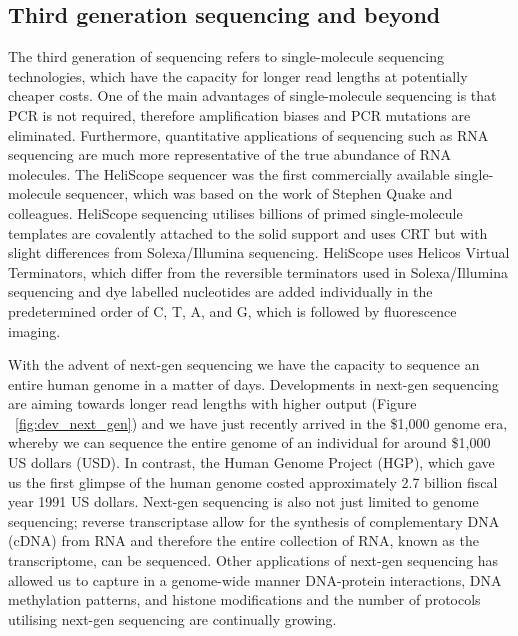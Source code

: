 \subsection{Third generation sequencing and beyond}

The third generation of sequencing refers to single-molecule sequencing technologies, which have the capacity for longer read lengths at potentially cheaper costs\cite{pmid20858600}. One of the main advantages of single-molecule sequencing is that PCR is not required, therefore amplification biases and PCR mutations are eliminated. Furthermore, quantitative applications of sequencing such as RNA sequencing are much more representative of the true abundance of RNA molecules. The HeliScope sequencer was the first commercially available single-molecule sequencer, which was based on the work of Stephen Quake and colleagues\cite{pmid12651960}. HeliScope sequencing utilises billions of primed single-molecule templates are covalently attached to the solid support and uses CRT but with slight differences from Solexa/Illumina sequencing. HeliScope uses Helicos Virtual Terminators, which differ from the reversible terminators used in Solexa/Illumina sequencing and dye labelled nucleotides are added individually in the predetermined order of C, T, A, and G, which is followed by fluorescence imaging.

With the advent of next-gen sequencing we have the capacity to sequence an entire human genome in a matter of days. Developments in next-gen sequencing are aiming towards longer read lengths with higher output (Figure ~\ref{fig:dev_next_gen}) and we have just recently arrived in the \$1,000 genome era, whereby we can sequence the entire genome of an individual for around \$1,000 US dollars (USD). In contrast, the Human Genome Project (HGP), which gave us the first glimpse of the human genome\cite{lander2001initial} costed approximately 2.7 billion fiscal year 1991 US dollars\cite{nhgri2010cost}. Next-gen sequencing is also not just limited to genome sequencing; reverse transcriptase\cite{pmid4316300, pmid4316301} allow for the synthesis of complementary DNA (cDNA) from RNA and therefore the entire collection of RNA, known as the transcriptome, can be sequenced. Other applications of next-gen sequencing has allowed us to capture in a genome-wide manner DNA-protein interactions, DNA methylation patterns, and histone modifications\cite{applicationsofsequencing} and the number of protocols utilising next-gen sequencing are continually growing\cite{pachter2014seq}.

